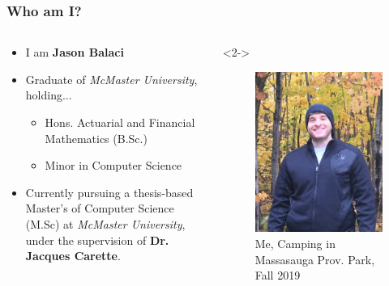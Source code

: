 \documentclass{beamer}
\begin{document}
\begin{frame}
    \frametitle{Who am I?}
    \begin{columns}[T,onlytextwidth]
        \begin{column}{.5\textwidth}
            \begin{minipage}{\textwidth}
                \begin{itemize}
                    \item<2-> I am \textbf{Jason Balaci}
                    \item<3-> Graduate of \emph{McMaster University}, holding...
                        \begin{itemize}
                            \item<4-> Hons. Actuarial and Financial Mathematics (B.Sc.)
                            \item<5-> Minor in Computer Science
                        \end{itemize}
                    \item<6-> Currently pursuing a thesis-based Master's of Computer Science (M.Sc) at \emph{McMaster University}, under the supervision of \textbf{Dr. Jacques Carette}.
                \end{itemize}
            \end{minipage}
        \end{column}
        \begin{column}{.45\textwidth}<2->
            \begin{figure}
                \includegraphics[width=.8\textwidth]{assets/me.jpeg}
                \caption{Me, Camping in Massasauga Prov. Park, Fall 2019}
            \end{figure}
        \end{column}
    \end{columns}
\end{frame}
\end{document}
